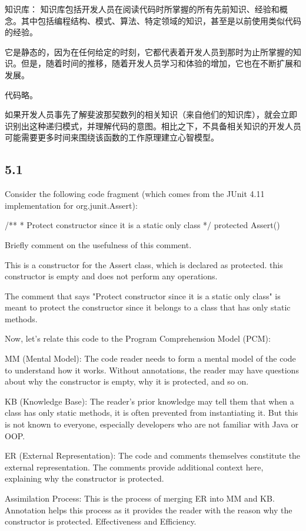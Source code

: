 \documentclass[]{ctexbook}
\begin{document}
知识库：
知识库包括开发人员在阅读代码时所掌握的所有先前知识、经验和概念。其中包括编程结构、模式、算法、特定领域的知识，甚至是以前使用类似代码的经验。

它是静态的，因为在任何给定的时刻，它都代表着开发人员到那时为止所掌握的知识。但是，随着时间的推移，随着开发人员学习和体验的增加，它也在不断扩展和发展。

代码略。

如果开发人员事先了解斐波那契数列的相关知识（来自他们的知识库），就会立即识别出这种递归模式，并理解代码的意图。相比之下，不具备相关知识的开发人员可能需要更多时间来围绕该函数的工作原理建立心智模型。

\subsection{5.1}
Consider the following code fragment (which comes from the JUnit 4.11 implementation for org.junit.Assert):

/**
* Protect constructor since it is a static only class
*/
protected Assert() {
    }

Briefly comment on the usefulness of this comment.

This is a constructor for the Assert class, which is declared as protected. this constructor is empty and does not perform any operations.

The comment that says "Protect constructor since it is a static only class" is meant to protect the constructor since it belongs to a class that has only static methods.

Now, let's relate this code to the Program Comprehension Model (PCM):

MM (Mental Model): The code reader needs to form a mental model of the code to understand how it works. Without annotations, the reader may have questions about why the constructor is empty, why it is protected, and so on.

KB (Knowledge Base): The reader's prior knowledge may tell them that when a class has only static methods, it is often prevented from instantiating it. But this is not known to everyone, especially developers who are not familiar with Java or OOP.

ER (External Representation): The code and comments themselves constitute the external representation. The comments provide additional context here, explaining why the constructor is protected.

Assimilation Process: This is the process of merging ER into MM and KB. Annotation helps this process as it provides the reader with the reason why the constructor is protected.
Effectiveness and Efficiency.
\end{document}
